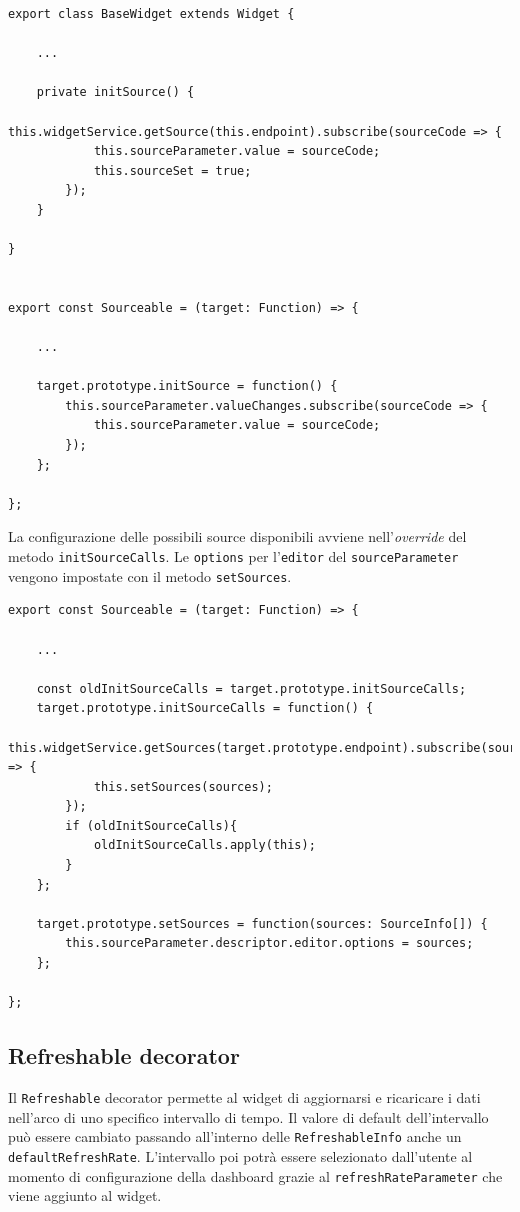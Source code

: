 \begin{lstlisting}[caption={Metodo initSource e override}, style=javaScriptCode]
export class BaseWidget extends Widget {
    
    ...
    
    private initSource() {
        this.widgetService.getSource(this.endpoint).subscribe(sourceCode => {
            this.sourceParameter.value = sourceCode;
            this.sourceSet = true;
        });
    }
    
}


export const Sourceable = (target: Function) => {

    ...

    target.prototype.initSource = function() {
        this.sourceParameter.valueChanges.subscribe(sourceCode => {
            this.sourceParameter.value = sourceCode;
        });
    };

};
\end{lstlisting}
La configurazione delle possibili source disponibili avviene nell'\textit{override} del metodo \verb|initSourceCalls|. Le \verb|options| per l'\verb|editor| del \verb|sourceParameter| vengono impostate con il metodo \verb|setSources|.

\begin{lstlisting}[caption={Metodo setSources e override del metodo initSourceCalls all'interno del Sourceable Decorator}, style=javaScriptCode]
export const Sourceable = (target: Function) => {

    ...
    
    const oldInitSourceCalls = target.prototype.initSourceCalls;
    target.prototype.initSourceCalls = function() {
        this.widgetService.getSources(target.prototype.endpoint).subscribe(sources => {
            this.setSources(sources);
        });
        if (oldInitSourceCalls){
            oldInitSourceCalls.apply(this);
        }
    };

    target.prototype.setSources = function(sources: SourceInfo[]) {
        this.sourceParameter.descriptor.editor.options = sources;
    };

};
\end{lstlisting}
\subsection{Refreshable decorator}
Il \verb|Refreshable| decorator permette al widget di aggiornarsi e ricaricare i dati nell'arco di uno specifico intervallo di tempo. Il valore di default dell'intervallo può essere cambiato passando all'interno delle \verb|RefreshableInfo| anche un \verb|defaultRefreshRate|.
L'intervallo poi potrà essere selezionato dall'utente al momento di configurazione della dashboard grazie al \verb|refreshRateParameter| che viene aggiunto al widget.


